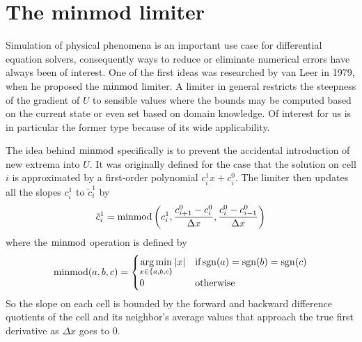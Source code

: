 \section{The minmod limiter}
\label{sec:minmod}

Simulation of physical phenomena is an important use case for differential equation solvers, consequently ways to reduce or eliminate numerical errors have always been of interest.
One of the first ideas was researched by van Leer in 1979, when he proposed the $\operatorname{minmod}$ limiter\cite{VanLeer1979}.
A limiter in general restricts the steepness of the gradient of $U$ to sensible values where the bounds may be computed based on the current state or even set based on domain knowledge.
Of interest for us is in particular the former type because of its wide applicability.

The idea behind $\operatorname{minmod}$ specifically is to prevent the accidental introduction of new extrema into $U$.
It was originally defined for the case that the solution on cell $i$ is approximated by a first-order polynomial $c_{i}^{1}x + c_{i}^{0}$.
The limiter then updates all the slopes $c_{i}^{1}$ to $\tilde{c}_{i}^{1}$ by
\begin{equation*}
  \tilde{c}_{i}^{1} = \operatorname{minmod}\left( c_{i}^{1}, \frac{c_{i + 1}^{0} - c_{i}^{0}}{\Delta x}, \frac{c_{i}^{0} - c_{i - 1}^{0}}{\Delta x} \right)
\end{equation*}
where the $\operatorname{minmod}$ operation is defined by
\begin{equation*}
  \operatorname{minmod}(a, b, c) = \begin{cases}
    \displaystyle\operatorname*{arg\,min}_{x \in \{ a, b, c \}} |x| & \text{if} \operatorname{sgn}(a) = \operatorname{sgn}(b) = \operatorname{sgn}(c)\\
    0 & \text{otherwise}
  \end{cases}
\end{equation*}
So the slope on each cell is bounded by the forward and backward difference quotients of the cell and its neighbor's average values that approach the true first derivative as $\Delta x$ goes to $0$.


